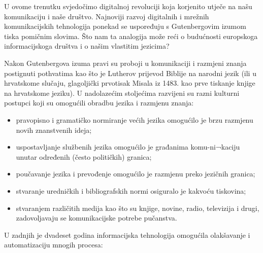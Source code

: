 \clearpage



\begin{multicols}{2}

U ovome trenutku svjedočimo digitalnoj revoluciji koja korjenito utječe na našu komunikaciju i naše društvo. Najnoviji razvoj digitalnih i mrežnih komunikacijskih tehnologija ponekad se uspoređuju s Gutenbergovim izumom tiska pomičnim slovima. Što nam ta analogija može reći o budućnosti europskoga informacijskoga društva i o našim vlastitim jezicima?


Nakon Gutenbergova izuma pravi su proboji u komunikaciji i razmjeni znanja postignuti pothvatima kao što je Lutherov prijevod Biblije na narodni jezik (ili u hrvatskome slučaju, glagoljički prvotisak Misala iz 1483. kao prve tiskanje knjige na hrvatskome jeziku). U nadolazećim stoljećima razvijeni su razni kulturni postupci koji su omogućili  obradbu jezika i razmjenu znanja:

\begin{itemize}
\item pravopisno i gramatičko normiranje većih jezika omogućilo je brzu razmjenu novih znanstvenih ideja;
\item uspostavljanje službenih jezika omogućilo je građanima komu-ni¬kaciju unutar određenih (često političkih) granica;
\item poučavanje jezika i prevođenje omogućilo je razmjenu preko jezičnih granica;
\item stvaranje uredničkih i bibliografskih normi osiguralo je kakvoću tiskovina;
\item stvaranjem različitih medija kao što su knjige, novine, radio, televizija i drugi, zadovoljavaju se komunikacijske potrebe pučanstva.
\end{itemize}

U zadnjih je dvadeset godina informacijska tehnologija omogućila olakšavanje i automatizaciju mnogih procesa:


\end{multicols}
